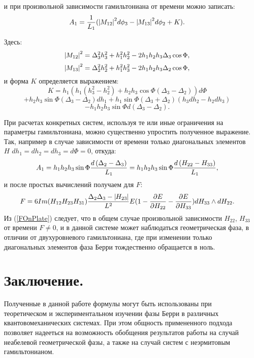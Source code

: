 \documentclass[a4paper,titlepage]{article}
\newcommand{\MathBr}[1]{\ifmmode{#1} \else{$#1$} \fi}
\newcommand{\mod}[1]{\MathBr{\mid\!\!#1\!\!\mid}}
\begin{document}
 и при произвольной зависимости гамильтониана от времени можно записать:
\[
  A_1 =  {1 \over L_1} (\mod{M_{12}}^2 d\phi_3 - \mod{M_{13}}^2 d\phi_2 + K).
\]

   Здесь:
\[
   \mod{M_{12}}^2 = \Delta_3^2h_3^2 + h_1^2h_2^2 - 2h_1h_2h_3\Delta_3\cos\Phi,
\]
\[
   \mod{M_{13}}^2 = \Delta_2^2h_2^2 + h_1^2h_3^2 - 2h_1h_2h_3\Delta_2\cos\Phi,
\]
  и форма $K$ определяется выражением:
\[
 K = h_1
 \left(h_1(h_3^2 - h_2^2) + h_2h_3\cos\Phi(\Delta_3 - \Delta_2)\right)d\Phi
\]
\[
  + h_2h_3\sin\Phi(\Delta_3 - \Delta_2)dh_1
  + h_1\sin\Phi(\Delta_3 + \Delta_2)(h_3dh_2 - h_2dh_3)
\]
\[
  - h_1h_2h_3\sin\Phi d\left(\Delta_3 -\Delta_2\right).
\]

При расчетах конкретных систем, используя те или иные ограничения на
параметры гамильтониана, можно существенно упростить полученное выражение.
Так, например в случае зависимости от времени только диагональных элементов
$H$ $dh_1=$$dh_2=$$dh_3=$$d\Phi=0$, откуда:
\[
  A_1 = h_1h_2h_3\sin\Phi {d\left(\Delta_2 -\Delta_3\right) \over L_1}
  = h_1h_2h_3\sin\Phi {d\left(H_{22}-H_{33}\right) \over L_1},
\]
и после простых вычислений получаем для $F$:
\begin{equation}
  F =
   6 Im(H_{12}H_{23}H_{31}) { \Delta_2 \Delta_3 - \mod{H_{23}} \over L^2 } E
 (1-{ \partial E \over \partial H_{22} }-{ \partial E \over \partial H_{33} })
  dH_{33} \wedge dH_{22}.
 \label{FOnPlate}
\end{equation}
  Из (\ref{FOnPlate}) следует, что в общем случае произвольной зависимости
$H_{22}$, $H_{33}$ от времени $F \ne 0$, и в данной
системе может наблюдаться геометрическая фаза, в отличии от двухуровневого
гамильтониана, где при изменении только диагональных элементов фаза Берри
тождественно обращается в ноль.


\newpage
\section{Заключение.}
 Полученные в данной работе формулы могут
быть использованы при теоретическом и экспериментальном изучении фазы Берри
в различных квантовомеханических системах. При этом общность примененного
подхода позволяет надееться на возможность обобщения результатов работы на
случай неабелевой геометрической фазы, а также на случай систем с неэрмитовым
гамильтонианом.
\end{document}
